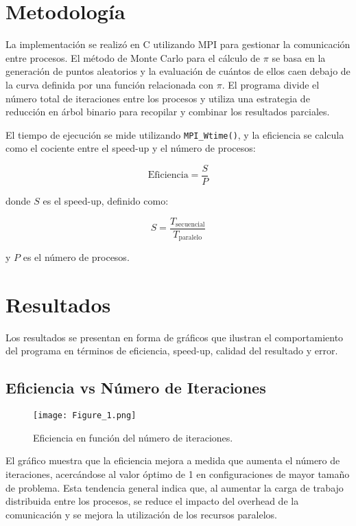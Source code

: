 \documentclass[conference, a4paper]{IEEEtran}
\begin{document}
\section{Metodología}
La implementación se realizó en C utilizando MPI para gestionar la comunicación entre procesos. El método de Monte Carlo para el cálculo de \(\pi\) se basa en la generación de puntos aleatorios y la evaluación de cuántos de ellos caen debajo de la curva definida por una función relacionada con \(\pi\). El programa divide el número total de iteraciones entre los procesos y utiliza una estrategia de reducción en árbol binario para recopilar y combinar los resultados parciales.

El tiempo de ejecución se mide utilizando \texttt{MPI\_Wtime()}, y la eficiencia se calcula como el cociente entre el speed-up y el número de procesos:

\begin{equation}
\text{Eficiencia} = \frac{S}{P}
\end{equation}

donde \( S \) es el speed-up, definido como:

\begin{equation}
S = \frac{T_{\text{secuencial}}}{T_{\text{paralelo}}}
\end{equation}

y \( P \) es el número de procesos.

\section{Resultados}
Los resultados se presentan en forma de gráficos que ilustran el comportamiento del programa en términos de eficiencia, speed-up, calidad del resultado y error.

\subsection{Eficiencia vs Número de Iteraciones}
\begin{figure}[h!]
    \centering
    \texttt{[image: Figure\_1.png]}
    \caption{Eficiencia en función del número de iteraciones.}
    \label{fig:eficiencia}
\end{figure}

El gráfico muestra que la eficiencia mejora a medida que aumenta el número de iteraciones, acercándose al valor óptimo de 1 en configuraciones de mayor tamaño de problema. Esta tendencia general indica que, al aumentar la carga de trabajo distribuida entre los procesos, se reduce el impacto del overhead de la comunicación y se mejora la utilización de los recursos paralelos. 
\end{document}
